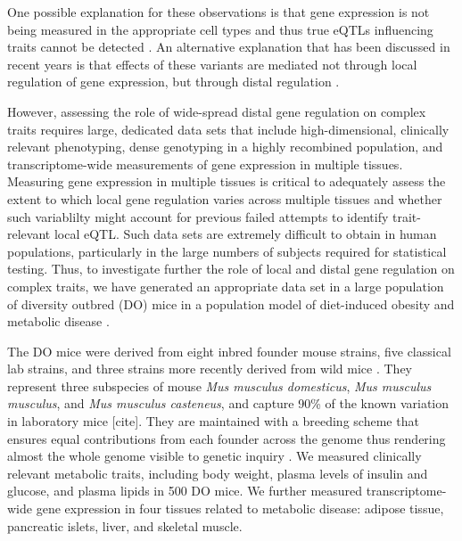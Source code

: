 \documentclass[
]{article}
\begin{document}
One possible explanation for these observations is that gene expression
is not being measured in the appropriate cell types and thus true eQTLs
influencing traits cannot be detected \cite{pmid32912663}. An
alternative explanation that has been discussed in recent years is that
effects of these variants are mediated not through local regulation of
gene expression, but through distal regulation
\cite{pmid37857933, pmid32424349, 
pmid32831138, pmid30950127}.

However, assessing the role of wide-spread distal gene regulation on
complex traits requires large, dedicated data sets that include
high-dimensional, clinically relevant phenotyping, dense genotyping in a
highly recombined population, and transcriptome-wide measurements of
gene expression in multiple tissues. Measuring gene expression in
multiple tissues is critical to adequately assess the extent to which
local gene regulation varies across multiple tissues and whether such
variablilty might account for previous failed attempts to identify
trait-relevant local eQTL. Such data sets are extremely difficult to
obtain in human populations, particularly in the large numbers of
subjects required for statistical testing. Thus, to investigate further
the role of local and distal gene regulation on complex traits, we have
generated an appropriate data set in a large population of diversity
outbred (DO) mice \cite{pmid22892839} in a population model of
diet-induced obesity and metabolic disease \cite{pmid29567659}.

The DO mice were derived from eight inbred founder mouse strains, five
classical lab strains, and three strains more recently derived from wild
mice \cite{pmid22892839}. They represent three subspecies of mouse
\textit{Mus musculus domesticus}, \textit{Mus musculus musculus}, and
\textit{Mus musculus casteneus}, and capture 90\% of the known variation
in laboratory mice {[}cite{]}. They are maintained with a breeding
scheme that ensures equal contributions from each founder across the
genome thus rendering almost the whole genome visible to genetic inquiry
\cite{pmid22892839}. We measured clinically relevant metabolic traits,
including body weight, plasma levels of insulin and glucose, and plasma
lipids in 500 DO mice. We further measured transcriptome-wide gene
expression in four tissues related to metabolic disease: adipose tissue,
pancreatic islets, liver, and skeletal muscle.
\end{document}
